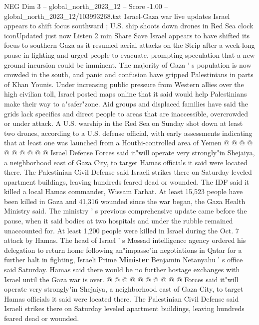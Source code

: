 \begin{textsample}{NEG Dim 3 – global\_north\_2023\_12 – Score -1.00 – global\_north\_2023\_12/103993268.txt}  \label{ex:f3_neg_240}
Israel-Gaza war live updates Israel appears to shift focus southward ; U.S. ship shoots down drones in Red Sea clock iconUpdated just now Listen 2 min Share Save Israel appears to have shifted its focus to southern Gaza as it resumed aerial attacks on the Strip after a week-long pause in fighting and urged people to evacuate, prompting speculation that a new ground incursion could be imminent.
The majority of Gaza ' s population is now crowded in the south, and panic and confusion have gripped Palestinians in parts of Khan Younis.
Under increasing public pressure from Western allies over the high civilian toll, Israel posted maps online that it said would help Palestinians make their way to a"safer"zone.
Aid groups and displaced families have said the grids lack specifics and direct people to areas that are inaccessible, overcrowded or under attack.
A U.S. warship in the Red Sea on Sunday shot down at least two drones, according to a U.S. defense official, with early assessments indicating that at least one was launched from a Houthi-controlled area of Yemen @ @ @ @ @ @ @ @ @ @ Israel Defense Forces said it"will operate very strongly"in Shejaiya, a neighborhood east of Gaza City, to target Hamas officials it said were located there.
The Palestinian Civil Defense said Israeli strikes there on Saturday leveled apartment buildings, leaving hundreds feared dead or wounded.
The IDF said it killed a local Hamas commander, Wissam Farhat.
At least 15,523 people have been killed in Gaza and 41,316 wounded since the war began, the Gaza Health Ministry said.
The ministry ' s previous comprehensive update came before the pause, when it said bodies at two hospitals and under the rubble remained unaccounted for.
At least 1,200 people were killed in Israel during the Oct. 7 attack by Hamas.
The head of Israel ' s Mossad intelligence agency ordered his delegation to return home following an"impasse"in negotiations in Qatar for a further halt in fighting, Israeli Prime \textbf{Minister} Benjamin Netanyahu ' s office said Saturday.
Hamas said there would be no further hostage exchanges with Israel until the Gaza war is over. @ @ @ @ @ @ @ @ @ @ Forces said it"will operate very strongly"in Shejaiya, a neighborhood east of Gaza City, to target Hamas officials it said were located there.
The Palestinian Civil Defense said Israeli strikes there on Saturday leveled apartment buildings, leaving hundreds feared dead or wounded.

\end{textsample}
